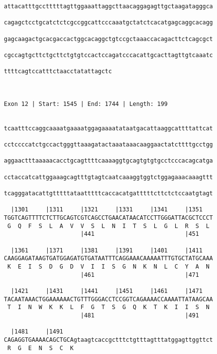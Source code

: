 \documentclass{article}
\begin{document}
\begin{Verbatim}
attacatttgcctttttagttggaaattaggcttaacaggagagttgctaagatagggca
                                                            
cagagctcctgcatctctcgccggcattcccaaatgctatctcacatgagcaggcacagg
                                                            
gagcaagactgcacgaccactggcacaggctgtccgctaaaccacagacttctcagcgct
                                                            
cgccagtgcttctgcttctgtgtccactccagatcccacattgcacttagttgtcaaatc
                                                            
ttttcagtccatttctaacctatattagctc
                               
                               
 
Exon 12 | Start: 1545 | End: 1744 | Length: 199


tcaatttccaggcaaaatgaaaatggagaaaatataatgacattaaggcattttattcat
                                                            
cctccccatctgccactgggttaaagatactaaataaacaaggaactatcttttgcctgg
                                                            
aggaactttaaaaacacctgcagttttcaaaaggtgcagtgtgtgcctcccacagcatga
                                                            
cctaccatcattggaaagcagtttgtagtcaatcaaaggtggtctggagaaacaaagttt
                                                            
tcagggatacattgtttttataatttttcaccacatgatttttcttctctccaatgtagt
                                                            
  |1301     |1311     |1321     |1331     |1341     |1351   
TGGTCAGTTTTCTCTTGCAGTCGTCAGCCTGAACATAACATCCTTGGGATTACGCTCCCT
 G  Q  F  S  L  A  V  V  S  L  N  I  T  S  L  G  L  R  S  L 
                      |441                          |451    
  
  |1361     |1371     |1381     |1391     |1401     |1411   
CAAGGAGATAAGTGATGGAGATGTGATAATTTCAGGAAACAAAAATTTGTGCTATGCAAA
 K  E  I  S  D  G  D  V  I  I  S  G  N  K  N  L  C  Y  A  N 
                      |461                          |471    
  
  |1421     |1431     |1441     |1451     |1461     |1471   
TACAATAAACTGGAAAAAACTGTTTGGGACCTCCGGTCAGAAAACCAAAATTATAAGCAA
 T  I  N  W  K  K  L  F  G  T  S  G  Q  K  T  K  I  I  S  N 
                      |481                          |491    
  
  |1481     |1491                                           
CAGAGGTGAAAACAGCTGCAgtaagtcaccgctttctgtttagtttatggagttggttct
 R  G  E  N  S  C  K                                        
                                                            

\end{Verbatim}
\end{document}
